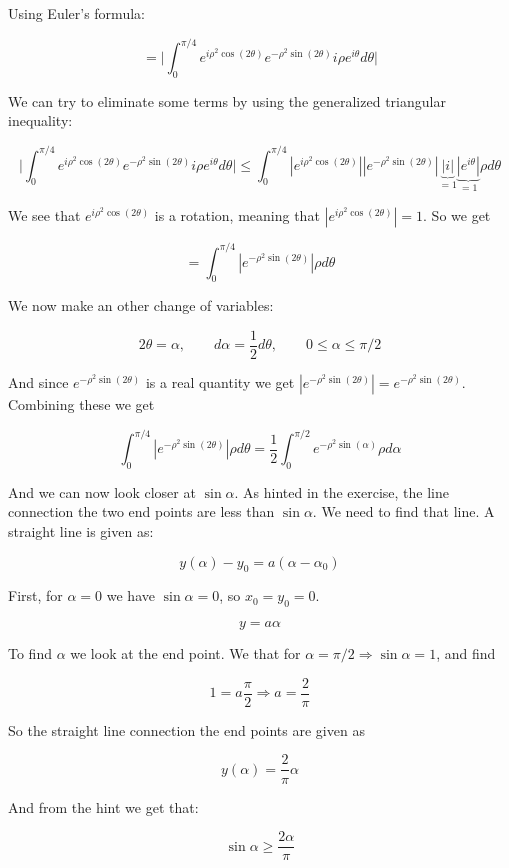 \documentclass[a4paper,norsk, 10pt]{article}
\begin{document}
Using Euler's formula:

$$
= \big|\int_0^{\pi/4} e^{i\rho^2 \cos(2\theta)}e^{-\rho^2 \sin(2\theta)} i\rho e^{i\theta} d\theta \big|
$$

We can try to eliminate some terms by using the generalized triangular inequality:

$$
\big|\int_0^{\pi/4} e^{i\rho^2 \cos(2\theta)}e^{-\rho^2 \sin(2\theta)} i\rho e^{i\theta} d\theta \big| \leq \int_0^{\pi/4} |e^{i\rho^2 \cos(2\theta)}||e^{-\rho^2 \sin(2\theta)}|\underbrace{|i|}_{=1}\underbrace{|e^{i\theta}|}_{=1}\rho d\theta
$$

We see that $e^{i\rho^2 \cos(2\theta)}$ is a rotation, meaning that $|e^{i\rho^2 \cos(2\theta)}| = 1$. So we get

$$
= \int_0^{\pi/4} |e^{-\rho^2 \sin(2\theta)}|\rho d\theta
$$

We now make an other change of variables:

$$
2\theta = \alpha, \qquad d\alpha = \frac{1}{2} d\theta, \qquad 0 \leq \alpha \leq \pi/2
$$

And since $e^{-\rho^2 \sin(2\theta)}$ is a real quantity we get $|e^{-\rho^2 \sin(2\theta)}| = e^{-\rho^2 \sin(2\theta)}$. Combining these we get 

$$
\int_0^{\pi/4} |e^{-\rho^2 \sin(2\theta)}|\rho d\theta = \frac{1}{2}\int_0^{\pi/2} e^{-\rho^2 \sin(\alpha)}\rho d\alpha
$$

And we can now look closer at $\sin \alpha$. As hinted in the exercise, the line connection the two end points are less than $\sin \alpha$. We need to find that line. A straight line is given as:

$$
y(\alpha) - y_0 = a(\alpha - \alpha_0)
$$

First, for $\alpha = 0$ we have $\sin \alpha = 0$, so $x_0 = y_0 = 0$.

$$
y = a\alpha
$$

To find $\alpha$ we look at the end point. We that for $\alpha = \pi/2 \Rightarrow \sin\alpha = 1$, and find 

$$
1 = a\frac{\pi}{2} \Rightarrow a = \frac{2}{\pi}
$$ 

So the straight line connection the end points are given as

$$
y(\alpha) = \frac{2}{\pi}\alpha
$$

And from the hint we get that:

\begin{equation}
\sin \alpha \geq \frac{2\alpha}{\pi}
\label{eq:sinStraight}
\end{equation}
\end{document}
